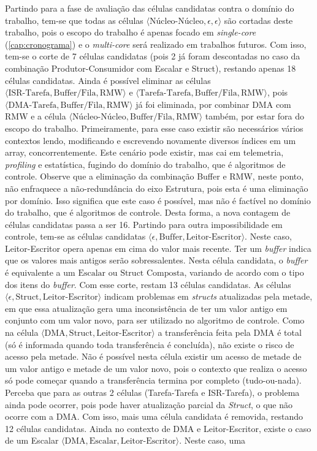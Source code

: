 \begin{sloppypar}
Partindo para a fase de avaliação das células candidatas contra o domínio do trabalho, tem-se que todas as células $\langle\text{Núcleo-Núcleo},\epsilon,\epsilon\rangle$ são cortadas deste trabalho, pois o escopo do trabalho é apenas focado em \textit{single-core} (\ref{cap:cronograma}) e o \textit{multi-core} será realizado em trabalhos futuros. Com isso, tem-se o corte de 7 células candidatas (pois 2 já foram descontadas no caso da combinação Produtor-Consumidor com Escalar e Struct), restando apenas 18 células candidatas. Ainda é possível eliminar as células $\langle\text{ISR-Tarefa},\text{Buffer/Fila},\text{RMW}\rangle$ e $\langle\text{Tarefa-Tarefa},\text{Buffer/Fila},\text{RMW}\rangle$, pois $\langle\text{DMA-Tarefa},\text{Buffer/Fila},\text{RMW}\rangle$ já foi eliminada, por combinar \ac{DMA} com \ac{RMW} e a célula $\langle\text{Núcleo-Núcleo},\text{Buffer/Fila},\text{RMW}\rangle$ também, por estar fora do escopo do trabalho. Primeiramente, para esse caso existir são necessários vários contextos lendo, modificando e escrevendo novamente diversos índices em um array, concorrentemente. Este cenário pode existir, mas cai em telemetria, \textit{profiling} e estatística, fugindo do domínio do trabalho, que é algoritmos de controle. Observe que a eliminação da combinação Buffer e \ac{RMW}, neste ponto, não enfraquece a não-redundância do eixo Estrutura, pois esta é uma eliminação por domínio. Isso significa que este caso é possível, mas não é factível no domínio do trabalho, que é algoritmos de controle. Desta forma, a nova contagem de células candidatas passa a ser 16. Partindo para outra impossibilidade em controle, tem-se as células candidatas $\langle\epsilon,\text{Buffer},\text{Leitor-Escritor}\rangle$. Neste caso, Leitor-Escritor opera apenas em cima do valor mais recente. Ter um \textit{buffer} indica que os valores mais antigos serão sobressalentes. Nesta célula candidata, o \textit{buffer} é equivalente a um $\text{Escalar}$ ou $\text{Struct Composta}$, variando de acordo com o tipo dos itens do \textit{buffer}. Com esse corte, restam 13 células candidatas. As células $\langle\epsilon,\text{Struct},\text{Leitor-Escritor}\rangle$ indicam problemas em \textit{structs} atualizadas pela metade, em que essa atualização gera uma inconsistência de ter um valor antigo em conjunto com um valor novo, para ser utilizado no algoritmo de controle. Como na célula $\langle\text{DMA},\text{Struct},\text{Leitor-Escritor}\rangle$ a transferência feita pela \ac{DMA} é total (só é informada quando toda transferência é concluída), não existe o risco de acesso pela metade. Não é possível nesta célula existir um acesso de metade de um valor antigo e metade de um valor novo, pois o contexto que realiza o acesso só pode começar quando a transferência termina por completo (tudo-ou-nada). Perceba que para as outras 2 células (Tarefa-Tarefa e ISR-Tarefa), o problema ainda pode ocorrer, pois pode haver atualização parcial da \textit{Struct}, o que não ocorre com a \ac{DMA}. Com isso, mais uma célula candidata é removida, restando 12 células candidatas. Ainda no contexto de \ac{DMA} e Leitor-Escritor, existe o caso de um Escalar $\langle\text{DMA},\text{Escalar},\text{Leitor-Escritor}\rangle$. Neste caso, uma 
\end{sloppypar}
